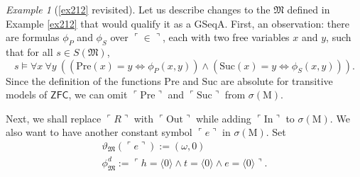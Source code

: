 \documentclass[12pt, twoside]{memoir}
\numberwithin{equation}{section}
\theoremstyle{definition}
\theoremstyle{remark}
\newtheorem{ex}[thm]{Example}
\theoremstyle{definition}
\theoremstyle{definition}
\theoremstyle{definition}
\theoremstyle{remark}
\begin{document}
\begin{ex}[\ref{ex212} revisited]\label{ex228}
Let us describe changes to the $\mathfrak{M}$ defined in Example \ref{ex212} that would qualify it as a GSeqA. First, an observation: there are formulas $\phi_P$ and $\phi_S$ over $\ulcorner \in \urcorner$, each with two free variables $x$ and $y$, such that for all $s \in S(\mathfrak{M})$,
\begin{equation*}
    s \models \forall x \ \forall y \ ((\mathrm{Pre}(x) = y \iff \phi_P(x, y)) \wedge (\mathrm{Suc}(x) = y \iff \phi_S(x, y))) \text{.}
\end{equation*}
Since the definition of the functions $\mathrm{Pre}$ and $\mathrm{Suc}$ are absolute for transitive models of $\mathsf{ZFC}$, we can omit $\ulcorner \mathrm{Pre} \urcorner$ and $\ulcorner \mathrm{Suc} \urcorner$ from $\sigma(\mathrm{M})$.

Next, we shall replace $\ulcorner R \urcorner$ with $\ulcorner \mathrm{Out} \urcorner$ while adding $\ulcorner \mathrm{In} \urcorner$ to $\sigma(\mathrm{M})$. We also want to have another constant symbol $\ulcorner e \urcorner$ in $\sigma(\mathrm{M})$. Set 
\begin{gather*}
    \vartheta_{\mathfrak{M}}(\ulcorner e \urcorner) := (\omega, 0) \\
    \phi^d_{\mathfrak{M}} := \ulcorner h = \langle 0 \rangle \wedge t = \langle 0 \rangle \wedge e = \langle 0 \rangle \urcorner \text{.}
\end{gather*}


\end{ex}
\end{document}
